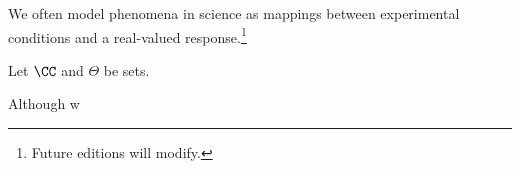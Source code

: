 

We often model phenomena in science as mappings between experimental conditions and a real-valued response.\footnote{Future editions will modify.}


Let $\CC$ and $\Theta$ be sets.



Although w


\blankpage
